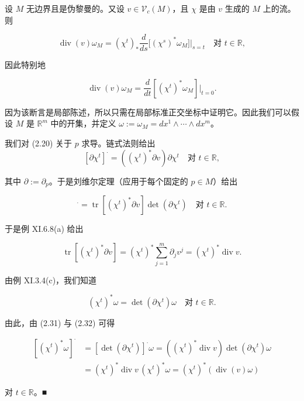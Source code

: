 \begin{proposition}

设 $ M $ 无边界且是伪黎曼的。又设 $ v \in \mathcal{V}_c(M) $，且 $ \chi $ 是由 $ v $ 生成的 $ M $ 上的流。则

\[
\operatorname{div}(v)\omega_M = (\chi^t)_*\frac{d}{ds}\big[(\chi^s)^*\omega_M\big]\Big|_{s=t} \quad \text{对 } t \in \mathbb{R} ,
\]

因此特别地

\[
\operatorname{div}(v)\omega_M = \frac{d}{dt}\left[(\chi^t)^*\omega_M\right]\big|_{t=0} .
\]

\proofhead
因为该断言是局部陈述，所以只需在局部标准正交坐标中证明它。因此我们可以假设 $ M $ 是 $ \mathbb{R}^m $ 中的开集，并定义 $ \omega := \omega_M = dx^1 \wedge \cdots \wedge dx^m $。

我们对 (2.20) 关于 $ p $ 求导。链式法则给出
\[
[\partial\chi^t]^{\cdot} = ((\chi^t)^*\partial v)\partial\chi^t \quad \text{对 } t \in \mathbb{R} ,
\]

其中 $ \partial := \partial_p $。于是刘维尔定理（应用于每个固定的 $ p \in M $）给出

\begin{equation}
[\det(\partial\chi^t)]^{\cdot} = \operatorname{tr}\left[(\chi^t)^*\partial v\right] \det(\partial\chi^t) \quad \text{对 } t \in \mathbb{R} .\tag{2.31}
\end{equation}

于是例 XI.6.8(a) 给出

\begin{equation}
\operatorname{tr}\left[(\chi^t)^*\partial v\right] = (\chi^t)^*\sum_{j=1}^{m}\partial_j v^j = (\chi^t)^*\operatorname{div} v .\tag{2.32}
\end{equation}

由例 XI.3.4(c)，我们知道

\[
(\chi^t)^*\omega = \det(\partial\chi^t)\omega \quad \text{对 } t \in \mathbb{R} .
\]

由此，由 (2.31) 与 (2.32) 可得

\begin{equation*}
\begin{aligned}
[(\chi^t)^*\omega]^{\cdot} &= [\det(\partial\chi^t)]^{\cdot}\omega = ((\chi^t)^*\operatorname{div} v)\det(\partial\chi^t)\omega \\ &= (\chi^t)^*\operatorname{div} v\,(\chi^t)^*\omega = (\chi^t)^*(\operatorname{div}(v)\omega)
\end{aligned}
\end{equation*}

对 $ t \in \mathbb{R} $。\nobreak\hspace{0.35em}■

\end{proposition}

